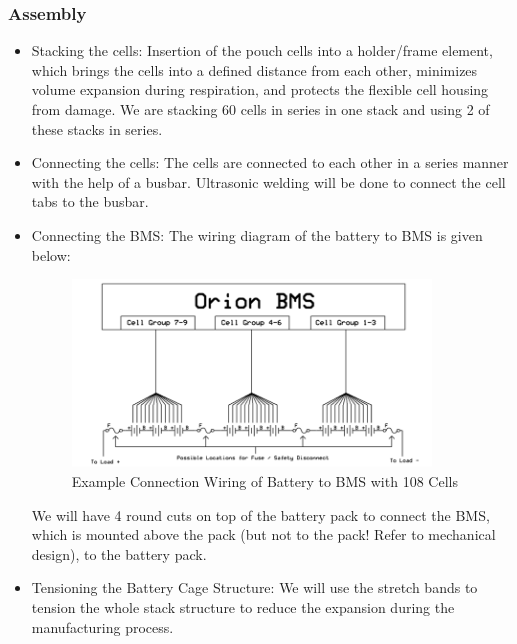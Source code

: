 \subsubsection*{Assembly}
\begin{itemize}
    \item Stacking the cells: Insertion of the pouch cells into a holder/frame element, which brings the cells into a defined distance from each other, minimizes volume expansion during respiration, and protects the flexible cell housing from damage. We are stacking 60 cells in series in one stack and using 2 of these stacks in series.
    \item Connecting the cells: The cells are connected to each other in a series manner with the help of a busbar. Ultrasonic welding will be done to connect the cell tabs to the busbar.
    \item Connecting the BMS: The wiring diagram of the battery to BMS is given below:
    \begin{figure}[H]
        \centering
        \includegraphics[width=0.9\textwidth]{texfiles/elec/eimg/BMSWiring}
        \caption{Example Connection Wiring of Battery to BMS with 108 Cells}
        \label{img: bmswiring}
    \end{figure}
    We will have 4 round cuts on top of the battery pack to connect the BMS, which is mounted above the pack (but not to the pack! Refer to mechanical design), to the battery pack. 
    \item Tensioning the Battery Cage Structure:
    We will use the stretch bands to tension the whole stack structure to reduce the expansion during the manufacturing process.    
\end{itemize}


